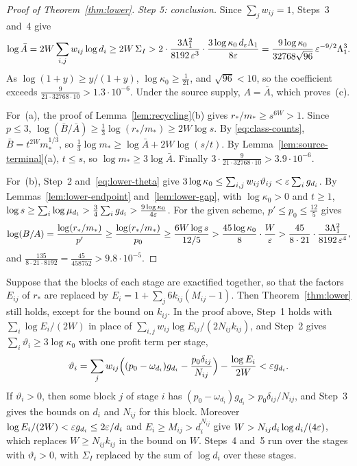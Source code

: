 \begin{proof}[Proof of Theorem~\ref{thm:lower}]
\emph{Step 5: conclusion.} Since \(\sum_jw_{ij}=1\), Steps~3 and~4 give
\[
 \log\bar A=2W\sum_{i,j}w_{ij}\log d_i\ge2W\,\Sigma_I
 >2\cdot\frac{3\Lambda_1^2}{8192\,\varepsilon^3}\cdot\frac{3\log\kappa_0\,d_\varepsilon\Lambda_1}{8\varepsilon}
 =\frac{9\log\kappa_0}{32768\sqrt{96}}\,\varepsilon^{-9/2}\Lambda_1^3 .
\]
As \(\log(1+y)\ge y/(1+y)\), \(\log\kappa_0\ge\frac1{21}\), and
\(\sqrt{96}<10\), so the coefficient exceeds
\(\frac9{21\cdot32768\cdot10}>1.3\cdot10^{-6}\). Under the source
supply, \(A=\bar A\), which proves~(c).

For~(a), the proof of Lemma~\ref{lem:recycling}(b) gives \(r_*/m_*\ge s^{6W}>1\).
Since \(p\le3\),
\(\log(\bar B/\bar A)\ge\frac13\log(r_*/m_*)\ge2W\log s\). By
\eqref{eq:class-counts}, \(\bar B=t^{2W}m_*^{1/3}\), so
\(\frac13\log m_*\ge\log\bar A+2W\log(s/t)\). By
Lemma~\ref{lem:source-terminal}(a), \(t\le s\), so
\(\log m_*\ge3\log\bar A\). Finally
\(3\cdot\frac9{21\cdot32768\cdot10}>3.9\cdot10^{-6}\).

For~(b), Step~2 and~\eqref{eq:lower-theta} give
\(3\log\kappa_0\le\sum_{i,j}w_{ij}\vartheta_{ij}<\varepsilon\sum_ig_{d_i}\). By
Lemmas~\ref{lem:lower-endpoint} and~\ref{lem:lower-gap}, with
\(\log\kappa_0>0\) and \(t\ge1\),
\(\log s\ge\sum_i\log\mu_{d_i}>\frac34\sum_ig_{d_i}>\frac{9\log\kappa_0}{4\varepsilon}\).
For the given scheme, \(p'\le p_0\le\frac{12}5\) gives
\[
 \log(B/A)=\frac{\log(r_*/m_*)}{p'}\ge\frac{\log(r_*/m_*)}{p_0}
 \ge\frac{6W\log s}{12/5}>\frac{45\log\kappa_0}8\cdot\frac W{\varepsilon}
 >\frac{45}{8\cdot21}\cdot\frac{3\Lambda_1^2}{8192\,\varepsilon^4},
\]
and \(\frac{135}{8\cdot21\cdot8192}=\frac{45}{458752}>9.8\cdot10^{-5}\).
\end{proof}

\begin{remark}\label{rem:joint-exactification}
Suppose that the blocks of each stage are exactified together, so that
the factors \(E_{ij}\) of \(r_*\) are replaced by
\(E_i=1+\sum_j6k_{ij}(M_{ij}-1)\). Then Theorem~\ref{thm:lower} still
holds, except for the bound on \(k_{ij}\). In the proof above, Step~1
holds with \(\sum_i\log E_i/(2W)\) in place of
\(\sum_{i,j}w_{ij}\log E_{ij}/(2N_{ij}k_{ij})\), and Step~2 gives
\(\sum_i\vartheta_i\ge3\log\kappa_0\) with one profit term per stage,
\[
 \vartheta_i=\sum_jw_{ij}\Bigl((p_0-\omega_{d_i})g_{d_i}-\frac{p_0\delta_{ij}}{N_{ij}}\Bigr)-\frac{\log E_i}{2W}
 <\varepsilon g_{d_i}.
\]
If \(\vartheta_i>0\), then some block \(j\) of stage \(i\) has
\((p_0-\omega_{d_i})g_{d_i}>p_0\delta_{ij}/N_{ij}\), and Step~3 gives the
bounds on \(d_i\) and \(N_{ij}\) for this block. Moreover
\(\log E_i/(2W)<\varepsilon g_{d_i}\le2\varepsilon/d_i\) and
\(E_i\ge M_{ij}>d_i^{N_{ij}}\) give \(W>N_{ij}d_i\log d_i/(4\varepsilon)\),
which replaces \(W\ge N_{ij}k_{ij}\) in the bound on \(W\). Steps~4
and~5 run over the stages with \(\vartheta_i>0\), with \(\Sigma_I\)
replaced by the sum of \(\log d_i\) over these stages.
\end{remark}

